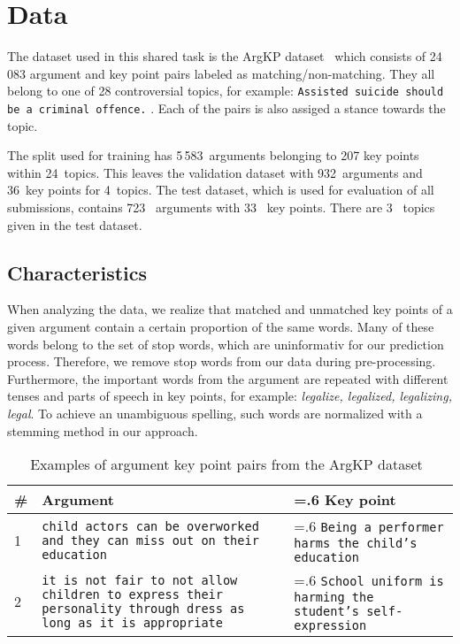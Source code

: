 \section{Data}\label{data}

The dataset used in this shared task is the ArgKP dataset~\cite{Bar-HaimEFKLS2020} which consists of 24\,083 argument and key point pairs labeled as matching/non-matching. They all belong to one of 28 controversial topics, for example: \texttt{Assisted suicide should be a criminal offence.} . Each of the pairs is also assiged a stance towards the topic. 

The split used for training has 5\,583~arguments belonging to 207 key points within 24~topics. This leaves the 
validation dataset with 932~arguments and 36~key points for 4~topics. The test dataset, which is used for evaluation of all submissions, contains 723~ arguments with 33~ key points. There are 3~ topics given in the test dataset.

\subsection{Characteristics}
When analyzing the data, we realize that matched and unmatched key points of a given argument contain a certain proportion of the same words. 
Many of these words belong to the set of stop words, which are uninformativ for our prediction process. Therefore, we remove stop words from our data during pre-processing. Furthermore, the important words from the argument are repeated with different tenses and parts of speech in key points, for example: \textit{legalize, legalized, legalizing, legal}. 
To achieve an unambiguous spelling, such words are normalized with a stemming method in our approach. 
\begin{table*}
  \caption{Examples of argument key point pairs from the ArgKP dataset~\cite{Bar-HaimEFKLS2020}}
  \label{tab:data-example}
  \begin{tabularx}{\linewidth}{lX>{\hsize=.6\hsize}X}
    \toprule
    \textbf{\#} & \textbf{Argument} & \textbf{Key point} \\
    \midrule
    1 & \texttt{child actors can be overworked and they can miss out on their education} & \texttt{Being a performer harms the child's education} \\
    2 & \texttt{it is not fair to not allow children to express their personality through dress as long as it is appropriate} & \texttt{School uniform is harming the student's self-expression}
  \end{tabularx}
\end{table*}


